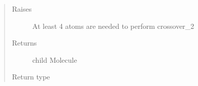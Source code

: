 \documentclass[letterpaper,10pt,english]{sphinxmanual}
\begin{document}
\begin{fulllineitems}
\begin{quote}
\begin{description}
\begin{itemize}
\end{itemize}

\item[{Raises}] \leavevmode
\sphinxAtStartPar
{} \textendash{} At least 4 atoms are needed to perform crossover\_2

\item[{Returns}] \leavevmode
\sphinxAtStartPar
child Molecule

\item[{Return type}] \leavevmode
\sphinxAtStartPar
{\hyperref[\detokenize{molecular:molecular.Molecule}]{}}

\end{description}\end{quote}

\end{fulllineitems}

\end{document}
